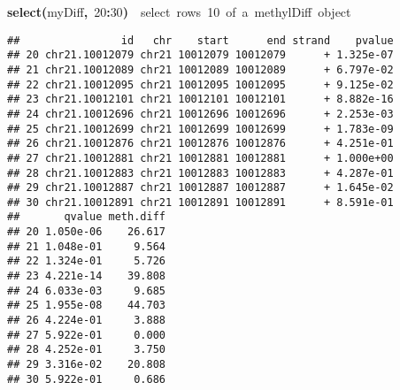 \documentclass{article}
\makeatletter
\newcommand{\hlnumber}[1]{\textcolor[rgb]{0,0,0}{#1}}%
\newcommand{\hlfunctioncall}[1]{\textcolor[rgb]{.5,0,.33}{\textbf{#1}}}%
\newcommand{\hlkeyword}[1]{\textbf{#1}}%
\newcommand{\hlcomment}[1]{\textcolor[rgb]{.18,.6,.34}{#1}}%
\newcommand{\hlsymbol}[1]{#1}%
\newenvironment{kframe}{%
 \def\FrameCommand##1{\hskip\@totalleftmargin \hskip-\fboxsep
 \colorbox{shadecolor}{##1}\hskip-\fboxsep
     \hskip-\linewidth \hskip-\@totalleftmargin \hskip\columnwidth}%
 \MakeFramed {\advance\hsize-\width
   \@totalleftmargin\z@ \linewidth\hsize
   \@setminipage}}%
 {\par\unskip\endMakeFramed}
\newenvironment{knitrout}{}{} %
\makeatother
\begin{document}
\begin{knitrout}
\begin{kframe}
\begin{flushleft}
\ttfamily\noindent
\hlfunctioncall{select}\hlkeyword{(}\hlsymbol{myDiff}\hlkeyword{,}{\ }\hlnumber{20}\hlkeyword{:}\hlnumber{30}\hlkeyword{)}{\ }{\ }\hlcomment{\usebox{\hlnormalsizeboxhash}{\ }select{\ }rows{\ }10{\ }of{\ }a{\ }methylDiff{\ }object}\mbox{}
\normalfont
\end{flushleft}
\begin{verbatim}
##                id   chr    start      end strand    pvalue
## 20 chr21.10012079 chr21 10012079 10012079      + 1.325e-07
## 21 chr21.10012089 chr21 10012089 10012089      + 6.797e-02
## 22 chr21.10012095 chr21 10012095 10012095      + 9.125e-02
## 23 chr21.10012101 chr21 10012101 10012101      + 8.882e-16
## 24 chr21.10012696 chr21 10012696 10012696      + 2.253e-03
## 25 chr21.10012699 chr21 10012699 10012699      + 1.783e-09
## 26 chr21.10012876 chr21 10012876 10012876      + 4.251e-01
## 27 chr21.10012881 chr21 10012881 10012881      + 1.000e+00
## 28 chr21.10012883 chr21 10012883 10012883      + 4.287e-01
## 29 chr21.10012887 chr21 10012887 10012887      + 1.645e-02
## 30 chr21.10012891 chr21 10012891 10012891      + 8.591e-01
##       qvalue meth.diff
## 20 1.050e-06    26.617
## 21 1.048e-01     9.564
## 22 1.324e-01     5.726
## 23 4.221e-14    39.808
## 24 6.033e-03     9.685
## 25 1.955e-08    44.703
## 26 4.224e-01     3.888
## 27 5.922e-01     0.000
## 28 4.252e-01     3.750
## 29 3.316e-02    20.808
## 30 5.922e-01     0.686
\end{verbatim}
\end{kframe}
\end{knitrout}
\end{document}

